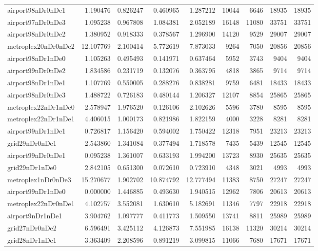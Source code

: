 \begin{longtable}{|l|r|r|r|r|r|r|r|r|}
airport98nDr0nDe1 & 1.190476 & 0.826247 & 0.460965 & 1.287212 & 10044 & 6646 & 18935 & 18935 \\
airport97nDr0nDe3 & 1.095238 & 0.967808 & 1.084381 & 2.052189 & 16148 & 11080 & 33751 & 33751 \\
airport98nDr0nDe2 & 1.380952 & 0.918333 & 0.378567 & 1.296900 & 14120 & 9529 & 29007 & 29007 \\
metroplex20nDr0nDe2 & 12.107769 & 2.100414 & 5.772619 & 7.873033 & 9264 & 7050 & 20856 & 20856 \\
airport98nDr1nDe0 & 1.105263 & 0.495493 & 0.141971 & 0.637464 & 5952 & 3743 & 9404 & 9404 \\
airport99nDr0nDe2 & 1.834586 & 0.231719 & 0.132076 & 0.363795 & 4818 & 3865 & 9714 & 9714 \\
airport98nDr1nDe1 & 1.107769 & 0.550005 & 0.288276 & 0.838281 & 9759 & 6481 & 18433 & 18433 \\
airport98nDr0nDe3 & 1.488722 & 0.726183 & 0.480144 & 1.206327 & 12107 & 8854 & 25865 & 25865 \\
metroplex22nDr1nDe0 & 2.578947 & 1.976520 & 0.126106 & 2.102626 & 5596 & 3780 & 8595 & 8595 \\
metroplex22nDr1nDe1 & 4.406015 & 1.000173 & 0.821986 & 1.822159 & 4000 & 3228 & 8281 & 8281 \\
airport99nDr1nDe1 & 0.726817 & 1.156420 & 0.594002 & 1.750422 & 12318 & 7951 & 23213 & 23213 \\
grid29nDr0nDe1 & 2.543860 & 1.341084 & 0.377494 & 1.718578 & 7435 & 5439 & 12545 & 12545 \\
airport99nDr0nDe1 & 0.095238 & 1.361007 & 0.633193 & 1.994200 & 13723 & 8930 & 25635 & 25635 \\
grid29nDr1nDe0 & 2.842105 & 0.651300 & 0.072610 & 0.723910 & 4348 & 3021 & 4993 & 4993 \\
metroplex1nDr0nDe3 & 15.270677 & 1.902702 & 10.874792 & 12.777494 & 11383 & 8750 & 27247 & 27247 \\
airport99nDr1nDe0 & 0.000000 & 1.446885 & 0.493630 & 1.940515 & 12962 & 7806 & 20613 & 20613 \\
metroplex22nDr0nDe1 & 4.102757 & 3.552081 & 1.630610 & 5.182691 & 11346 & 7797 & 22918 & 22918 \\
airport9nDr1nDe1 & 3.904762 & 1.097777 & 0.411773 & 1.509550 & 13741 & 8811 & 25989 & 25989 \\
grid27nDr0nDe2 & 6.596491 & 3.425112 & 4.126873 & 7.551985 & 16138 & 11320 & 30214 & 30214 \\
grid28nDr1nDe1 & 3.363409 & 2.208596 & 0.891219 & 3.099815 & 11066 & 7680 & 17671 & 17671 \\

\end{longtable}
